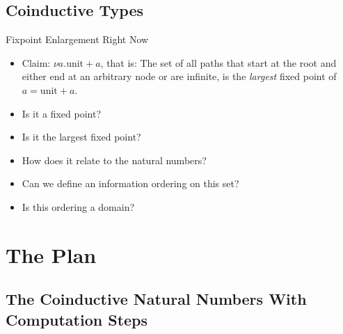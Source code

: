 \documentclass{beamer}
\begin{document}
\subsection{Coinductive Types}

\begin{frame}{Fixpoint Enlargement Right Now}

  \begin{itemize}
    \item Claim: $\nu a . \text{unit} + a$, that is: The set of all paths that start
          at the root and either end at an arbitrary node or are infinite, is
          the \emph{largest} fixed point of $a = \text{unit} + a$.
    \item Is it a fixed point?
    \item Is it the largest fixed point?
    \item How does it relate to the natural numbers?
    \item Can we define an information ordering on this set?
    \item Is this ordering a domain?
  \end{itemize}

\end{frame}


\section{The Plan}

\subsection{The Coinductive Natural Numbers With Computation Steps}
\end{document}
